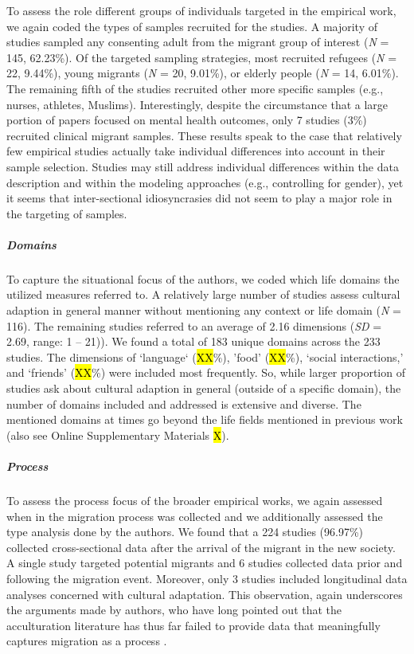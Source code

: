 To assess the role different groups of individuals targeted in the
empirical work, we again coded the types of samples recruited for the
studies. A majority of studies sampled any consenting adult from the
migrant group of interest (\textit{N} = 145, 62.23\%). Of the targeted
sampling strategies, most recruited refugees (\textit{N} = 22, 9.44\%),
young migrants (\textit{N} = 20, 9.01\%), or elderly people (\textit{N}
= 14, 6.01\%). The remaining fifth of the studies recruited other more
specific samples (e.g., nurses, athletes, Muslims). Interestingly,
despite the circumstance that a large portion of papers focused on
mental health outcomes, only 7 studies (3\%) recruited clinical migrant
samples. These results speak to the case that relatively few empirical
studies actually take individual differences into account in their
sample selection. Studies may still address individual differences
within the data description and within the modeling approaches (e.g.,
controlling for gender), yet it seems that inter-sectional
idiosyncrasies did not seem to play a major role in the targeting of
samples.

\subparagraph{Domains}

To capture the situational focus of the authors, we coded which life
domains the utilized measures referred to. A relatively large number of
studies assess cultural adaption in general manner without mentioning
any context or life domain (\textit{N} = 116). The remaining studies
referred to an average of 2.16 dimensions (\textit{SD} = 2.69, range: 1
-- 21)). We found a total of 183 unique domains across the 233 studies.
The dimensions of `language` (\hl{XX}\%), 'food' (\hl{XX}\%), `social
interactions,' and `friends' (\hl{XX}\%) were included most frequently.
So, while larger proportion of studies ask about cultural adaption in
general (outside of a specific domain), the number of domains included
and addressed is extensive and diverse. The mentioned domains at times
go beyond the life fields mentioned in previous work (also see Online
Supplementary Materials \hl{X}).

\vspace{1em}

\subparagraph{Process}

To assess the process focus of the broader empirical works, we again
assessed when in the migration process was collected and we additionally
assessed the type analysis done by the authors. We found that a 224
studies (96.97\%) collected cross-sectional data after the arrival of
the migrant in the new society. A single study targeted potential
migrants and 6 studies collected data prior and following the migration
event. Moreover, only 3 studies included longitudinal data analyses
concerned with cultural adaptation. This observation, again underscores
the arguments made by authors, who have long pointed out that the
acculturation literature has thus far failed to provide data that
meaningfully captures migration as a process
\citep[e.g.,][]{Brown2011, Ward2019}.

